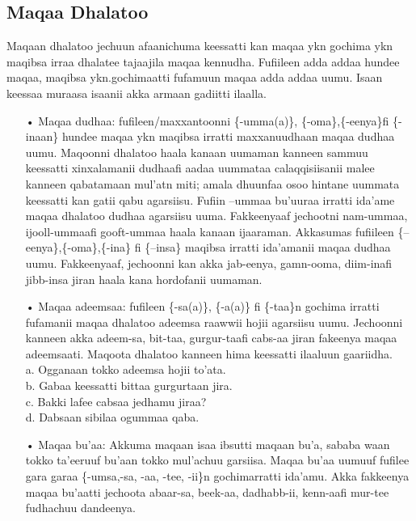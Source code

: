 \documentclass[11pt,b5paper]{book}
\begin{document}
\subsection{Maqaa Dhalatoo}

Maqaan dhalatoo jechuun afaanichuma keessatti kan maqaa ykn gochima ykn maqibsa irraa dhalatee tajaajila maqaa kennudha. Fufiileen adda addaa hundee maqaa, maqibsa ykn.gochimaatti fufamuun maqaa adda addaa uumu. Isaan keessaa muraasa isaanii akka armaan gadiitti ilaalla.\\
\begin{itemize}

\item[•] Maqaa dudhaa: fufileen/maxxantoonni \{-umma(a)\}, \{-oma\},\{-eenya\}fi \{-inaan\} hundee maqaa ykn maqibsa irratti maxxanuudhaan maqaa dudhaa uumu. Maqoonni dhalatoo haala kanaan uumaman kanneen sammuu keessatti xinxalamanii dudhaafi aadaa uummataa calaqqisiisanii malee kanneen qabatamaan mul'atn miti; amala dhuunfaa osoo hintane uummata keessatti kan gatii qabu agarsiisu. Fufiin {–ummaa} bu'uuraa irratti ida’ame maqaa dhalatoo dudhaa agarsiisu uuma. Fakkeenyaaf jechootni nam-ummaa, ijooll-ummaafi gooft-ummaa haala kanaan ijaaraman. Akkasumas fufiileen \{–eenya\},\{-oma\},\{-ina\} fi \{–insa\} maqibsa irratti ida’amanii maqaa dudhaa uumu. Fakkeenyaaf, jechoonni kan akka jab-eenya, gamn-ooma, diim-inafi jibb-insa jiran haala kana hordofanii uumaman. 

\item[•] Maqaa adeemsaa: fufileen \{-sa(a)\}, \{-a(a)\} fi \{-taa\}n gochima irratti fufamanii maqaa dhalatoo adeemsa raawwii hojii agarsiisu uumu. Jechoonni kanneen akka adeem-sa, bit-taa, gurgur-taafi cabs-aa jiran fakeenya maqaa adeemsaati. Maqoota dhalatoo kanneen hima keessatti ilaaluun gaariidha.\\
a. Ogganaan tokko adeemsa hojii to’ata.\\
b. Gabaa keessatti bittaa gurgurtaan jira.\\
c. Bakki lafee cabsaa jedhamu jiraa?\\
d. Dabsaan sibilaa ogummaa qaba.

\item[•] Maqaa bu’aa: Akkuma maqaan isaa ibsutti maqaan bu'a, sababa waan tokko ta’eeruuf bu’aan tokko mul’achuu garsiisa. Maqaa bu’aa uumuuf fufilee gara garaa \{-umsa,-sa, -aa, -tee, -ii\}n gochimarratti ida’amu. Akka fakkeenya maqaa bu'aatti jechoota abaar-sa, beek-aa, dadhabb-ii, kenn-aafi mur-tee fudhachuu dandeenya.


\end{itemize}
\end{document}
